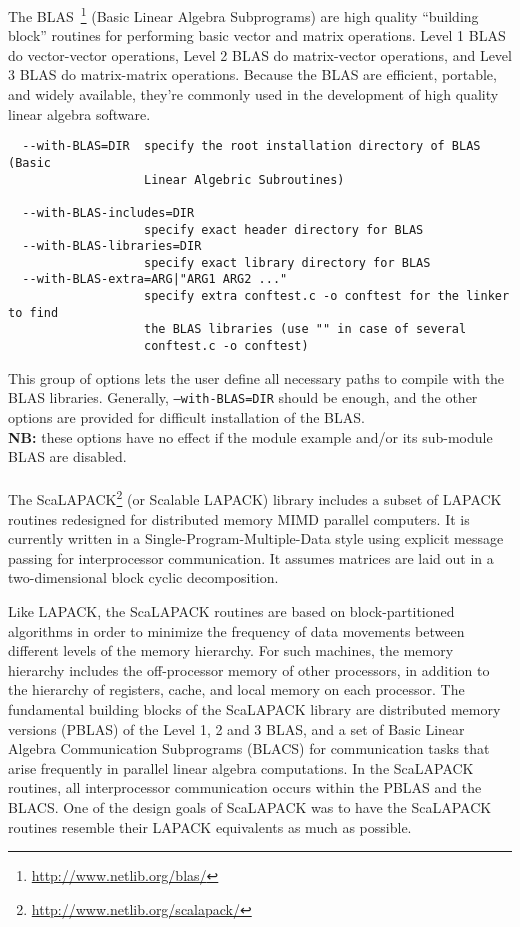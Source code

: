 The BLAS~\footnote{\url{http://www.netlib.org/blas/}} (Basic Linear
Algebra Subprograms) are high quality ``building block'' routines for
performing basic vector and matrix operations.  Level 1 BLAS do
vector-vector operations, Level 2 BLAS do matrix-vector operations,
and Level 3 BLAS do matrix-matrix operations. Because the BLAS are
efficient, portable, and widely available, they're commonly used in
the development of high quality linear algebra software.

{\footnotesize
\begin{verbatim}
  --with-BLAS=DIR  specify the root installation directory of BLAS (Basic
                   Linear Algebric Subroutines)

  --with-BLAS-includes=DIR
                   specify exact header directory for BLAS
  --with-BLAS-libraries=DIR
                   specify exact library directory for BLAS
  --with-BLAS-extra=ARG|"ARG1 ARG2 ..."
                   specify extra conftest.c -o conftest for the linker to find
                   the BLAS libraries (use "" in case of several 
                   conftest.c -o conftest)
\end{verbatim}
}
\noindent This group of options lets the user define all necessary
paths to compile with the BLAS libraries. Generally,
\texttt{--with-BLAS=DIR} should be enough, and the other options are
provided for difficult installation of the BLAS.\\ \textbf{NB:} these
options have no effect if the module example and/or its sub-module
BLAS are disabled.

\paragraph{\scalapack}

The ScaLAPACK\footnote{\url{http://www.netlib.org/scalapack/}} (or
Scalable LAPACK) library includes a subset of LAPACK routines
redesigned for distributed memory MIMD parallel computers. It is
currently written in a Single-Program-Multiple-Data style using
explicit message passing for interprocessor communication. It assumes
matrices are laid out in a two-dimensional block cyclic decomposition.

Like LAPACK, the ScaLAPACK routines are based on block-partitioned
algorithms in order to minimize the frequency of data movements
between different levels of the memory hierarchy. For such machines,
the memory hierarchy includes the off-processor memory of other
processors, in addition to the hierarchy of registers, cache, and
local memory on each processor.  The fundamental building blocks of
the ScaLAPACK library are distributed memory versions (PBLAS) of the
Level 1, 2 and 3 BLAS, and a set of Basic Linear Algebra Communication
Subprograms (BLACS) for communication tasks that arise frequently in
parallel linear algebra computations. In the ScaLAPACK routines, all
interprocessor communication occurs within the PBLAS and the BLACS.
One of the design goals of ScaLAPACK was to have the ScaLAPACK
routines resemble their LAPACK equivalents as much as possible.

